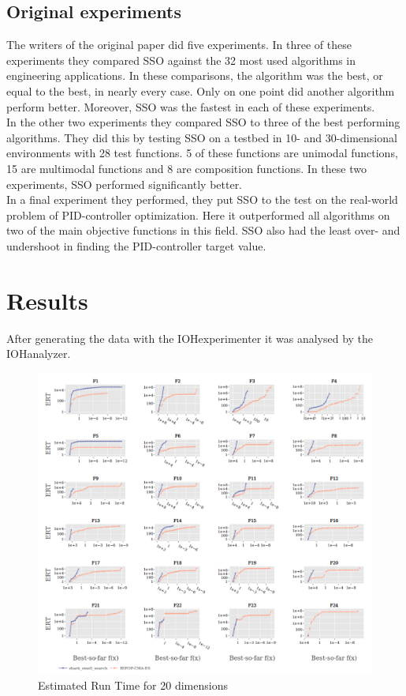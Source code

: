 \documentclass[runningheads]{llncs}
\begin{document}
\subsection{Original experiments}
The writers of the original paper did five experiments. In three of these experiments they compared SSO against the 32 most used algorithms in engineering applications. In these comparisons, the algorithm was the best, or equal to the best, in nearly every case. Only on one point did another algorithm perform better. Moreover, SSO was the fastest in each of these experiments. \\
In the other two experiments they compared SSO to three of the best performing algorithms. They did this by testing SSO on a testbed in 10- and 30-dimensional environments with 28 test functions. 5 of these functions are unimodal functions, 15 are multimodal functions and 8 are composition functions. In these two experiments, SSO performed significantly better.\\
In a final experiment they performed, they put SSO to the test on the real-world problem of PID-controller optimization. Here it outperformed all algorithms on two of the main objective functions in this field. SSO also had the least over- and undershoot in finding the PID-controller target value.

\section{Results}
After generating the data with the IOHexperimenter it was analysed by the IOHanalyzer.

\begin{figure}[h!]
    \centering
    \includegraphics[scale =0.6]{D20-ERT.png}
    \caption{Estimated Run Time for 20 dimensions}
    \label{fig:ERT}
\end{figure}
\end{document}
